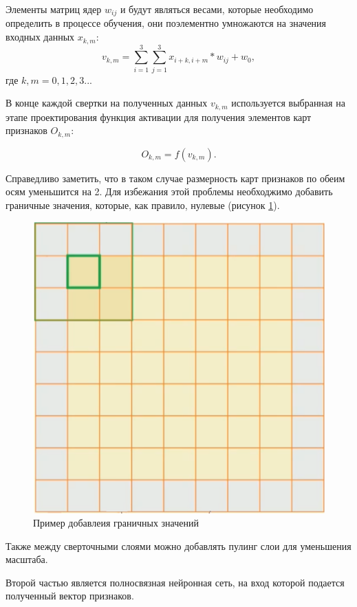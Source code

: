 Элементы матриц ядер $w_{ij}$ и будут являться весами, которые необходимо определить в процессе обучения, они поэлементно умножаются на значения входных данных $x_{k,m}$:
\begin{equation}\label{eq:Vkm}
 v_{k,m} = \sum_{i=1}^{3}{\sum_{j=1}^{3}{x_{i+k,i+m}*w_{ij}}}+w_{0},
\end{equation}
где $k,m = 0,1,2,3...$

В конце каждой свертки на полученных данных $v_{k,m}$ используется выбранная на этапе проектирования функция активации для получения элементов карт признаков $O_{k,m}$:

\begin{equation}\label{eq:Okm}
O_{k,m}=f(v_{k,m}).
\end{equation}


Справедливо заметить, что в таком случае размерность карт признаков по обеим осям уменьшится на 2. Для избежания этой проблемы необходжимо добавить граничные значения, которые, как правило, нулевые (рисунок \ref{fig:3}).

\begin{figure}[ht] 
  \center
  \includegraphics [scale=0.9] {img/padd.png}
  \caption{Пример добавлеия граничных значений} 
  \label{fig:3}  
\end{figure}

Также между сверточными слоями можно добавлять пулинг слои для уменьшения масштаба.

Второй частью является полносвязная нейронная сеть, на вход которой подается полученный вектор признаков.